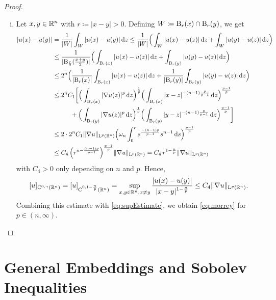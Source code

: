 \begin{proof}
\begin{enumerate}[i)]
    \item Let $x, y \in \mathbb{R}^n$ with $r \coloneqq |x - y| > 0$.
      Defining $W \coloneqq \mathrm{B}_r(x) \cap \mathrm{B}_r(y)$, we get
      \begin{align*}
        |u(x) - u(y)|
        &= \frac{1}{|W|} \int_W |u(x) - u(y)| \d z
        \leq \frac{1}{|W|} \Big(\int_W |u(x) - u(z)| \d z + \int_W |u(y) - u(z)| \d z \Big) \\
        &\leq \frac{1}{|\BB_{\frac{r}{2}}(\frac{x + y}{2})|} \Big( \int_{\BB_r(x)} |u(x) - u(z)|\d z + \int_{\BB_r(y)} |u(y) - u(z)| \d z \Big) \\
        &\leq 2^n \Big( \frac{1}{|\BB_r(x)|} \int_{\BB_r(x)} |u(x) - u(z)| \d z + \frac{1}{|\BB_r(y)|} \int_{\BB_r(y)} |u(y) - u(z)| \d z \Big) \\
        &\leq 2^n C_1 \bigg[ \Big( \int_{\BB_r(x)} |\nabla u(z)|^p \d z \Big)^{\frac{1}{p}} \Big( \int_{\BB_r(x)} |x - z|^{-(n - 1)\frac{p}{p - 1}} \d z \Big)^{\frac{p - 1}{p}} \\
        &\hspace{2.8em} + \Big( \int_{\BB_r(y)} |\nabla u(z)|^p \d z \Big)^{\frac{1}{p}} \Big( \int_{\BB_r(y)} |y - z|^{-(n - 1)\frac{p}{p - 1}} \d z \Big)^{\frac{p - 1}{p}} \bigg] \\
        &\leq 2 \cdot 2^n C_1 \|\nabla u\|_{\Ell^p(\R^n)} \Big( \omega_n \int_0^r s^{\frac{-(n - 1)p}{p - 1}} s^{n - 1} \d s \Big)^{\frac{p - 1}{p}} \\
        &\leq C_4 \, \Big( r^{n - \frac{(n - 1)p}{p - 1}} \Big)^{\frac{p - 1}{p}} \|\nabla u\|_{\Ell^p(\R^n)} 
        = C_4 \, r^{1 - \frac{n}{p}} \|\nabla u\|_{\Ell^p(\R^n)}
      \end{align*}
      with $C_4 > 0$ only depending on $n$ and $p$.
      Hence,
      $$
      [u]_{\mathrm{C}^{0,\gamma}(\mathbb{R}^n)}
      = [u]_{\mathrm{C}^{0,1 - \frac{n}{p}}(\mathbb{R}^n)}
      = \sup_{x,y \in \mathbb{R}^n, x \neq y} \frac{|u(x) - u(y)|}{|x - y|^{1 - \frac{n}{p}}}
      \leq C_4 \|\nabla u\|_{\mathrm{L}^p(\mathbb{R}^n)}.
      $$
      Combining this estimate with \eqref{eq:supEstimate}, we obtain \eqref{eq:morrey} for $p \in (n,\infty)$. \qedhere
  \end{enumerate}
\end{proof}


\section{General Embeddings and Sobolev Inequalities}


